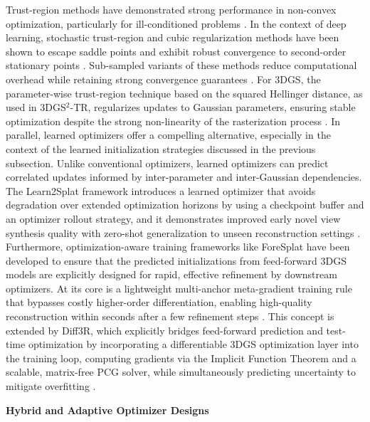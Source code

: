 \documentclass[11pt]{article}
\begin{document}
Trust-region methods have demonstrated strong performance in non-convex optimization, particularly for ill-conditioned problems \cite{ref162}. In the context of deep learning, stochastic trust-region and cubic regularization methods have been shown to escape saddle points and exhibit robust convergence to second-order stationary points \cite{ref163}. Sub-sampled variants of these methods reduce computational overhead while retaining strong convergence guarantees \cite{ref164}. For 3DGS, the parameter-wise trust-region technique based on the squared Hellinger distance, as used in 3DGS\(^2\)-TR, regularizes updates to Gaussian parameters, ensuring stable optimization despite the strong non-linearity of the rasterization process \cite{ref158}. In parallel, learned optimizers offer a compelling alternative, especially in the context of the learned initialization strategies discussed in the previous subsection. Unlike conventional optimizers, learned optimizers can predict correlated updates informed by inter-parameter and inter-Gaussian dependencies. The Learn2Splat framework introduces a learned optimizer that avoids degradation over extended optimization horizons by using a checkpoint buffer and an optimizer rollout strategy, and it demonstrates improved early novel view synthesis quality with zero-shot generalization to unseen reconstruction settings \cite{ref147}. Furthermore, optimization-aware training frameworks like ForeSplat have been developed to ensure that the predicted initializations from feed-forward 3DGS models are explicitly designed for rapid, effective refinement by downstream optimizers. At its core is a lightweight multi-anchor meta-gradient training rule that bypasses costly higher-order differentiation, enabling high-quality reconstruction within seconds after a few refinement steps \cite{ref165}. This concept is extended by Diff3R, which explicitly bridges feed-forward prediction and test-time optimization by incorporating a differentiable 3DGS optimization layer into the training loop, computing gradients via the Implicit Function Theorem and a scalable, matrix-free PCG solver, while simultaneously predicting uncertainty to mitigate overfitting \cite{ref166}.

\textbf{Hybrid and Adaptive Optimizer Designs}
\end{document}
